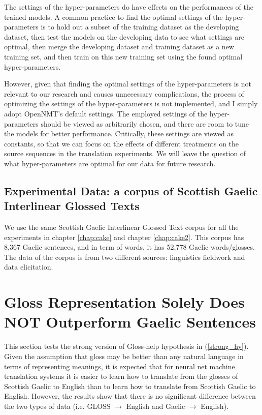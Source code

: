 \documentclass[final]{ua-thesis}
\numberwithin{equation}{section}
\begin{document}
The settings of the hyper-parameters do have effects on the performances of the trained models.
A common practice to find the optimal settings of the hyper-parameters is to hold out a subset of the training dataset as the developing dataset, then test the models on the developing data to see what settings are optimal, then merge the developing dataset and training dataset as a new training set, and then train on this new training set using the found optimal hyper-parameters.

However, given that finding the optimal settings of the hyper-parameters is not relevant to our research and causes unnecessary complications, the process of optimizing the settings of the hyper-parameters is not implemented, and I simply adopt OpenNMT's default settings. The employed settings of the hyper-parameters should be viewed as arbitrarily chosen, and there are room to tune the models for better performance. Critically, these settings are viewed as constants, so that we can focus on the effects of different treatments on the source sequences in the translation experiments.  We will leave the question of what hyper-parameters are optimal for our data for future research.

\subsection{Experimental Data: a corpus of Scottish Gaelic Interlinear Glossed Texts}

We use the same Scottish Gaelic Interlinear Glossed Text corpus \citep{gaelic_igt} for all the experiments in chapter \ref{chap:cake} and chapter \ref{chap:cake2}. 
This corpus has 8,367 Gaelic sentences, and in term of words, it has 52,778 Gaelic words/glosses. The data of the corpus is from two different sources: linguistics fieldwork and data elicitation.


\section{Gloss Representation Solely Does NOT Outperform Gaelic Sentences} \label{gd_to_gl_to_en}
This section tests the strong version of Gloss-help hypothesis in (\ref{strong_hy}).
Given the assumption that gloss may be better than any natural language in terms of representing meanings, it is expected that for neural net machine translation systems it is easier to learn how to translate from the glosses of Scottish Gaelic to English than to learn how to translate from Scottish Gaelic to English. However, the results show that there is no significant difference between the two types of data (i.e. GLOSS $\rightarrow$ English and Gaelic $\rightarrow$ English).
\end{document}
